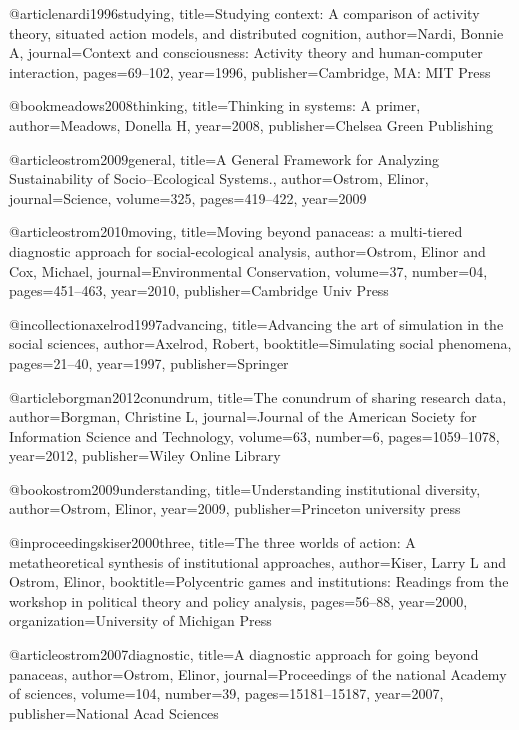 @article{nardi1996studying,
  title={Studying context: A comparison of activity theory, situated action models, and distributed cognition},
  author={Nardi, Bonnie A},
  journal={Context and consciousness: Activity theory and human-computer interaction},
  pages={69--102},
  year={1996},
  publisher={Cambridge, MA: MIT Press}
}


@book{meadows2008thinking,
  title={Thinking in systems: A primer},
  author={Meadows, Donella H},
  year={2008},
  publisher={Chelsea Green Publishing}
}

@article{ostrom2009general,
  title={A General Framework for Analyzing Sustainability of Socio--Ecological Systems.},
  author={Ostrom, Elinor},
  journal={Science},
  volume={325},
  pages={419--422},
  year={2009}
}

@article{ostrom2010moving,
  title={Moving beyond panaceas: a multi-tiered diagnostic approach for social-ecological analysis},
  author={Ostrom, Elinor and Cox, Michael},
  journal={Environmental Conservation},
  volume={37},
  number={04},
  pages={451--463},
  year={2010},
  publisher={Cambridge Univ Press}
}

@incollection{axelrod1997advancing,
  title={Advancing the art of simulation in the social sciences},
  author={Axelrod, Robert},
  booktitle={Simulating social phenomena},
  pages={21--40},
  year={1997},
  publisher={Springer}
}



@article{borgman2012conundrum,
  title={The conundrum of sharing research data},
  author={Borgman, Christine L},
  journal={Journal of the American Society for Information Science and Technology},
  volume={63},
  number={6},
  pages={1059--1078},
  year={2012},
  publisher={Wiley Online Library}
}


@book{ostrom2009understanding,
  title={Understanding institutional diversity},
  author={Ostrom, Elinor},
  year={2009},
  publisher={Princeton university press}
}

@inproceedings{kiser2000three,
  title={The three worlds of action: A metatheoretical synthesis of institutional approaches},
  author={Kiser, Larry L and Ostrom, Elinor},
  booktitle={Polycentric games and institutions: Readings from the workshop in political theory and policy analysis},
  pages={56--88},
  year={2000},
  organization={University of Michigan Press}
}



@article{ostrom2007diagnostic,
  title={A diagnostic approach for going beyond panaceas},
  author={Ostrom, Elinor},
  journal={Proceedings of the national Academy of sciences},
  volume={104},
  number={39},
  pages={15181--15187},
  year={2007},
  publisher={National Acad Sciences}
}

